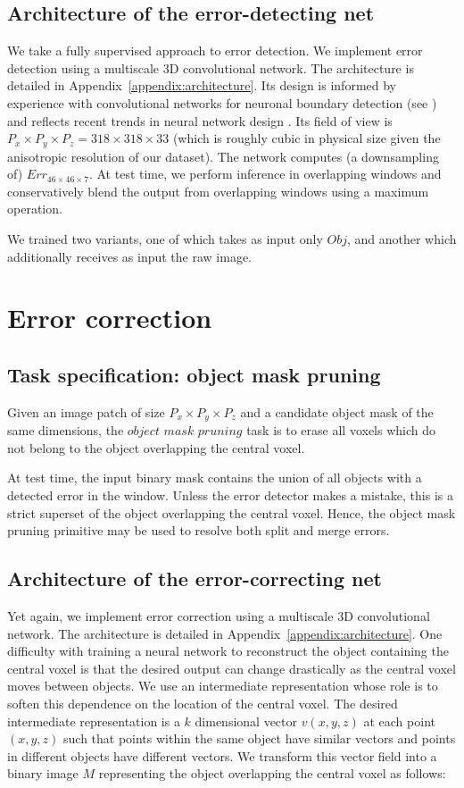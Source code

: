 \documentclass{article}
\begin{document}
\subsection{Architecture of the error-detecting net}
We take a fully supervised approach to error detection. We implement error detection using a multiscale 3D convolutional network. The architecture is detailed in Appendix~\ref{appendix:architecture}. Its design is informed by experience with convolutional networks for neuronal boundary detection (see \cite{kisuk}) and reflects recent trends in neural network design \cite{unet,resnet}. Its field of view is $P_x\times P_y\times P_z=318\times 318\times 33$ (which is roughly cubic in physical size given the anisotropic resolution of our dataset). The network computes (a downsampling of) $Err_{46 \times 46 \times 7}$. At test time, we perform inference in overlapping windows and conservatively blend the output from overlapping windows using a maximum operation.

We trained two variants, one of which takes as input only $Obj$, and another which additionally receives as input the raw image.

\section{Error correction}
\subsection{Task specification: object mask pruning}
Given an image patch of size $P_x\times P_y\times P_z$ and a candidate object mask of the same dimensions, the $\textit{object mask pruning}$ task is to erase all voxels which do not belong to the object overlapping the central voxel.

At test time, the input binary mask contains the union of all objects with a detected error in the window. Unless the error detector makes a mistake, this is a strict superset of the object overlapping the central voxel. Hence, the object mask pruning primitive may be used to resolve both split and merge errors.

\subsection{Architecture of the error-correcting net}
Yet again, we implement error correction using a multiscale 3D convolutional network. The architecture is detailed in Appendix~\ref{appendix:architecture}. One difficulty with training a neural network to reconstruct the object containing the central voxel is that the desired output can change drastically as the central voxel moves between objects. We use an intermediate representation whose role is to soften this dependence on the location of the central voxel. The desired intermediate representation is a $k$ dimensional vector $v(x,y,z)$ at each point $(x,y,z)$ such that points within the same object have similar vectors and points in different objects have different vectors. We transform this vector field into a binary image $M$ representing the object overlapping the central voxel as follows:
\end{document}
